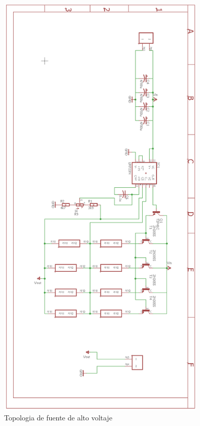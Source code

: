 \begin{figure}[H]
\centering
\includegraphics[width=10cm]{Capitulo3/figs/fuente.png}
\caption{Topologia de fuente de alto voltaje}
\end{figure}

